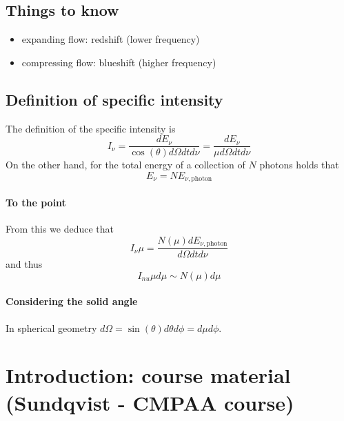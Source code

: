 \documentclass[../main/main.tex]{subfiles}
\begin{document}
\subsection{Things to know}
\begin{itemize}
\item expanding flow: redshift (lower frequency)
\item compressing flow: blueshift (higher frequency)
\end{itemize}

\subsection{Definition of specific intensity}
\label{specific_intensity}
The definition of the specific intensity is 
\begin{equation}
I_{\nu} 
	= \frac{dE_{\nu}}{\cos(\theta) d\Omega dt d\nu} 
	= \frac{dE_{\nu}}{\mu d\Omega dt d\nu} 
\end{equation}
On the other hand, for the total energy of a collection of $N$ photons holds that 
\begin{equation}
E_{\nu} = N E_{\nu,\text{photon}} 
\end{equation}

\paragraph{To the point}
From this we deduce that 
\begin{equation}
I_{\nu} \mu  = \frac{N(\mu) dE_{\nu,\text{photon}}}{d\Omega dt d\nu}
\end{equation}
and thus 
\begin{equation}
\boxed{I_{nu} \mu d\mu \sim N(\mu) d\mu}
\end{equation}

\paragraph{Considering the solid angle}
In spherical geometry $d\Omega = \sin(\theta) d\theta d\phi = d\mu d\phi$.



\newpage
\section{Introduction: course material (Sundqvist - CMPAA course)}
\end{document}
